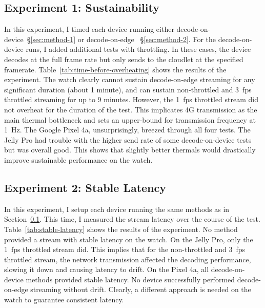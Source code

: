 \subsection{Experiment 1: Sustainability}
\label{sec:exp1-sustainability}
In this experiment, I timed each device running either decode-on-device~\S\ref{sec:method-1} or decode-on-edge ~\S\ref{sec:method-2}. For the decode-on-device runs, I added additional tests with throttling. In these cases, the device decodes at the full frame rate but only sends to the cloudlet at the specified framerate. Table~\ref{tab:time-before-overheating} shows the results of the experiment. The watch clearly cannot sustain decode-on-edge streaming for any significant duration (about 1 minute), and can sustain non-throttled and 3~fps throttled streaming for up to 9 minutes.  However, the 1~fps throttled stream did not overheat for the duration of the test. This implicates 4G transmission as the main thermal bottleneck and sets an upper-bound for transmission frequency at 1~Hz. The Google Pixel 4a, unsurprisingly, breezed through all four tests. The Jelly Pro had trouble with the higher send rate of some decode-on-device tests but was overall good. This shows that slightly better thermals would drastically improve sustainable performance on the watch. 


\subsection{Experiment 2: Stable Latency}
In this experiment, I setup each device running the same methods as in Section~\ref{sec:exp1-sustainability}. This time, I measured the stream latency over the course of the test. Table~\ref{tab:stable-latency} shows the results of the experiment. No method provided a stream with stable latency on the watch. On the Jelly Pro, only the 1~fps throttled stream did. This implies that for the non-throttled and 3~fps throttled stream, the network transmission affected the decoding performance, slowing it down and causing latency to drift. On the Pixel 4a, all decode-on-device methods provided stable latency. No device successfully performed decode-on-edge streaming without drift. Clearly, a different approach is needed on the watch to guarantee consistent latency.

